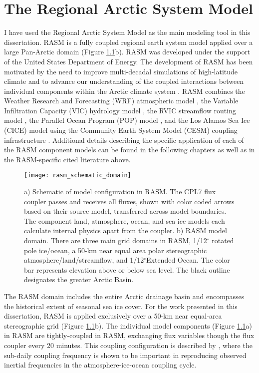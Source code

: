 
\chapter{The Regional Arctic System Model}
\label{chap:rasm}

I have used the Regional Arctic System Model as the main modeling tool in this dissertation.
RASM is a fully coupled regional earth system model applied over a large Pan-Arctic domain (Figure \ref{fig:rasm}b).
RASM was developed under the support of the United States Department of Energy.
The development of RASM has been motivated by the need to improve multi-decadal simulations of high-latitude climate and to advance our understanding of the coupled interactions between individual components within the Arctic climate system \citep{Roberts_2010}.
RASM combines the Weather Research and Forecasting (WRF) atmospheric model \citep{Skamarock_2008,Cassano_2016}, the Variable Infiltration Capacity (VIC) hydrology model \citep{Hamman_2016a,Liang_1994,Liang_1996}, the RVIC streamflow routing model \citep{Hamman_2016b,Lohmann_1996}, the Parallel Ocean Program (POP) model \citep{Smith_2010}, and the Los Alamos Sea Ice (CICE) model \citep{Roberts_2015a,Hunke2013,Hunke2015} using the Community Earth System Model (CESM) coupling infrastructure \citep{Craig_2012}.
Additional details describing the specific application of each of the RASM component models can be found in the following chapters as well as in the RASM-specific cited literature above.

\begin{figure}
  \centering
  \texttt{[image: rasm\_schematic\_domain]}
  \caption{a) Schematic of model configuration in RASM.
  The CPL7 flux coupler passes and receives all fluxes, shown with color coded arrows based on their source model, transferred across model boundaries.
  The component land, atmosphere, ocean, and sea ice models each calculate internal physics apart from the coupler.
  b) RASM model domain.
  There are three main grid domains in RASM, 1/12$^{\circ}$ rotated pole ice/ocean, a 50-km near equal area polar stereographic atmosphere/land/streamflow, and 1/12$^{\circ}$Extended Ocean.
  The color bar represents elevation above or below sea level.
  The black outline designates the greater Arctic Basin.}
  \label{fig:rasm}
\end{figure}

The RASM domain includes the entire Arctic drainage basin and encompasses the historical extent of seasonal sea ice cover.
For the work presented in this dissertation, RASM is applied exclusively over a 50-km near equal-area stereographic grid (Figure \ref{fig:rasm}b).
The individual model components (Figure \ref{fig:rasm}a) in RASM are tightly-coupled in RASM, exchanging flux variables though the flux coupler every 20 minutes.
This coupling configuration is described by \citet{Roberts_2015a}, where the sub-daily coupling frequency is shown to be important in reproducing observed inertial frequencies in the atmosphere-ice-ocean coupling cycle.

